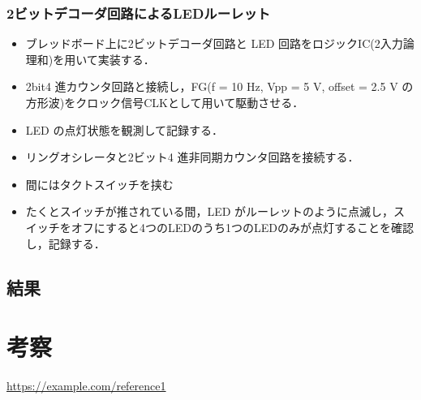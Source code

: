 \documentclass{ltjsarticle}
\begin{document}
\subsubsection{2ビットデコーダ回路によるLEDルーレット}
\begin{itemize}
  \item ブレッドボード上に2ビットデコーダ回路と LED 回路をロジックIC(2入力論理和)を用いて実装する．
  \item 2bit4 進カウンタ回路と接続し，FG(f = 10 Hz, Vpp = 5 V, offset = 2.5 V の方形波)をクロック信号CLKとして用いて駆動させる．
  \item LED の点灯状態を観測して記録する．
\end{itemize}

\begin{itemize}
  \item リングオシレータと2ビット4 進非同期カウンタ回路を接続する．
  \item 間にはタクトスイッチを挟む
  \item たくとスイッチが推されている間，LED がルーレットのように点滅し，スイッチをオフにすると4つのLEDのうち1つのLEDのみが点灯することを確認し，記録する．
\end{itemize}
\subsection{結果}

\section{考察}

\begin{thebibliography}{9}
 \url{https://example.com/reference1}
\end{thebibliography}
\end{document}
